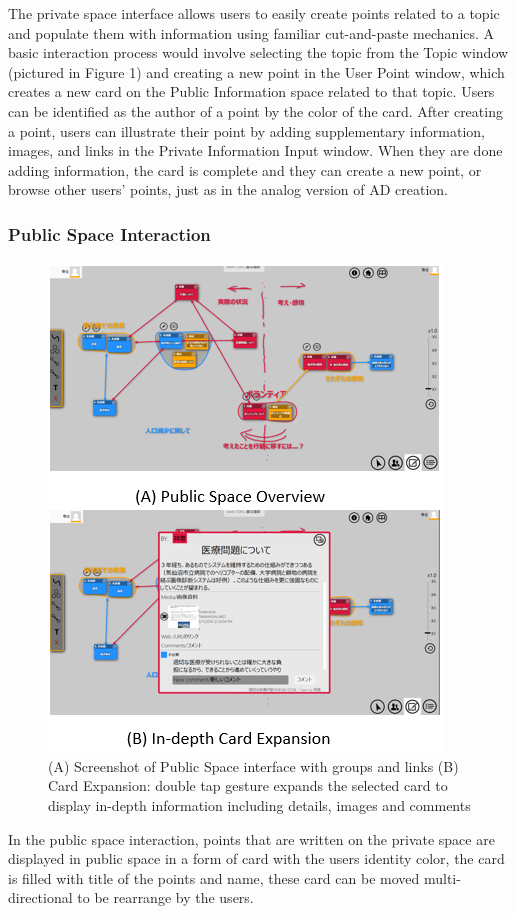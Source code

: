 \documentclass{sigchi}
\begin{document}
\begin{itemize}
The private space interface allows users to easily create points related to a topic and populate them with information using familiar cut-and-paste mechanics. A basic interaction process would involve selecting the topic from the Topic window (pictured in Figure 1) and creating a new point in the User Point window, which creates a new card on the Public Information space related to that topic. Users can be identified as the author of a point by the color of the card. After creating a point, users can illustrate their point by adding supplementary information, images, and links in the Private Information Input window. When they are done adding information, the card is complete and they can create a new point, or browse other users' points, just as in the analog version of AD creation.

\subsubsection{Public Space Interaction}

\begin{figure}[!h]
\centering
\includegraphics[width=1.0\columnwidth]{public4}
\caption{(A) Screenshot of Public Space interface with groups and links (B) Card Expansion: double tap gesture expands the selected card to display in-depth information including details, images and comments}
\label{fig:figure1}
\end{figure}
In the public space interaction, points that are written on the private space are displayed in public space in a form of card with the users identity color, the card is filled with title of the points and name, these card can be moved multi-directional to be rearrange by the users.


\end{itemize}
\end{document}
